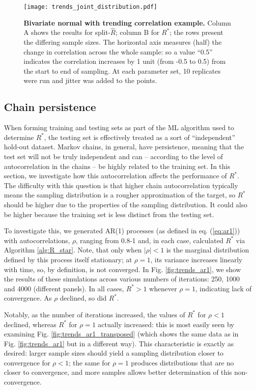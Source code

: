 \documentclass{article}
\begin{document}
\begin{figure}[!htb]
	\centerline{\texttt{[image: trends\_joint\_distribution.pdf]}}
	\caption{\textbf{Bivariate normal with trending correlation example.} Column A shows the results for split-$\widehat{R}$; column B for $R^*$; the rows present the differing sample sizes. The horizontal axis measures (half) the change in correlation across the whole sample: so a value ``0.5'' indicates the correlation increases by 1 unit (from -0.5 to 0.5) from the start to end of sampling. At each parameter set, 10 replicates were run and jitter was added to the points.}
	\label{fig:trends_joint_distribution}
\end{figure}

\subsection{Chain persistence}\label{sec:non-stationary_persistence}
When forming training and testing sets as part of the ML algorithm used to determine $R^*$, the testing set is effectively treated as a sort of ``independent'' hold-out dataset. Markov chains, in general, have persistence, meaning that the test set will not be truly independent and can -- according to the level of autocorrelation in the chains -- be highly related to the training set. In this section, we investigate how this autocorrelation affects the performance of $R^*$. The difficulty with this question is that higher chain autocorrelation typically means the sampling distribution is a rougher approximation of the target, so $R^*$ should be higher due to the properties of the sampling distribution. It could also be higher because the training set is less distinct from the testing set.

To investigate this, we generated AR(1) processes (as defined in eq. (\ref{eq:ar1})) with autocorrelations, $\rho$, ranging from 0.8-1 and, in each case, calculated $R^*$ via Algorithm \ref{alg:R_star}. Note, that only when $|\rho|<1$ is the marginal distribution defined by this process itself stationary; at $\rho=1$, its variance increases linearly with time, so, by definition, is not converged. In Fig. \ref{fig:trends_ar1}, we show the results of these simulations across various numbers of iterations: 250, 1000 and 4000 (different panels). In all cases, $R^*>1$ whenever $\rho=1$, indicating lack of convergence. As $\rho$ declined, so did $R^*$.

Notably, as the number of iterations increased, the values of $R^*$ for $\rho<1$ declined, whereas $R^*$ for $\rho=1$ actually increased: this is most easily seen by examining Fig. \ref{fig:trends_ar1_transposed} (which shows the same data as in Fig. \ref{fig:trends_ar1} but in a different way). This characteristic is exactly as desired: larger sample sizes should yield a sampling distribution closer to convergence for $\rho<1$; the same for $\rho=1$ produces distributions that are no closer to convergence, and more samples allows better determination of this non-convergence.
\end{document}
